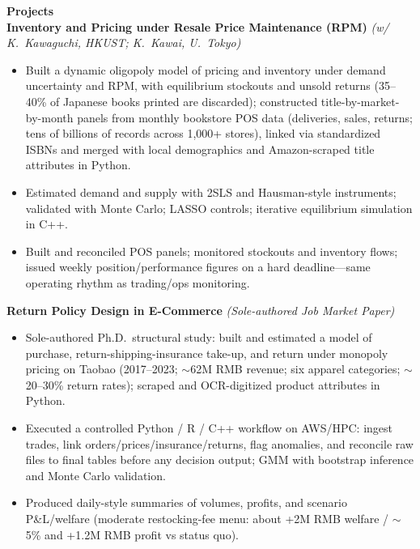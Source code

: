 \documentclass[11pt,letterpaper]{article}
\begin{document}
{\large \textbf{Projects}}\\[-0.5pt]
\textbf{Inventory and Pricing under Resale Price Maintenance (RPM)} \textit{(w/ K.\ Kawaguchi, HKUST; K.\ Kawai, U.\ Tokyo)}\\
\vspace{-6pt}
\begin{itemize}
  \item Built a dynamic oligopoly model of pricing and inventory under demand uncertainty and RPM, with equilibrium stockouts and unsold returns (35--40\% of Japanese books printed are discarded); constructed title-by-market-by-month panels from monthly bookstore POS data (deliveries, sales, returns; tens of billions of records across 1{,}000+ stores), linked via standardized ISBNs and merged with local demographics and Amazon-scraped title attributes in Python.
  \item Estimated demand and supply with 2SLS and Hausman-style instruments; validated with Monte Carlo; LASSO controls; iterative equilibrium simulation in C++.
  \item Built and reconciled POS panels; monitored stockouts and inventory flows; issued weekly position/performance figures on a hard deadline---same operating rhythm as trading/ops monitoring.
\end{itemize}
\vspace{-3pt}
\textbf{Return Policy Design in E-Commerce} \textit{(Sole-authored Job Market Paper)}\\
\vspace{-6pt}
\begin{itemize}
  \item Sole-authored Ph.D.\ structural study: built and estimated a model of purchase, return-shipping-insurance take-up, and return under monopoly pricing on Taobao (2017--2023; \(\sim\)62M RMB revenue; six apparel categories; \(\sim\)20--30\% return rates); scraped and OCR-digitized product attributes in Python.
  \item Executed a controlled Python / R / C++ workflow on AWS/HPC: ingest trades, link orders/prices/insurance/returns, flag anomalies, and reconcile raw files to final tables before any decision output; GMM with bootstrap inference and Monte Carlo validation.
  \item Produced daily-style summaries of volumes, profits, and scenario P\&L/welfare (moderate restocking-fee menu: about +2M RMB welfare / \(\sim\)5\% and +1.2M RMB profit vs status quo).
\end{itemize}
\end{document}
